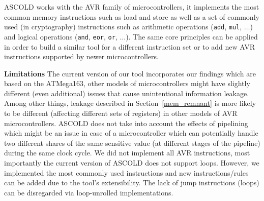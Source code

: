 ASCOLD works with the AVR family of microcontrollers, 
it implements the most common memory instructions such as load and store 
as well as a set of commonly used (in cryptography) instructions such as arithmetic operations
(\texttt{add}, \texttt{mul}, $\dots$) and logical operations (\texttt{and}, \texttt{eor}, \texttt{or}, $\dots$). The same core principles can be applied
in order to build a similar tool for a different instruction set or to add 
new AVR instructions supported by newer microcontrollers.

\textbf{Limitations} The current version of our tool
incorporates our findings which are based on the ATMega163, other models of microcontrollers
might have slightly different (even additional) issues that cause unintentional information leakage.
Among other things, leakage described in Section~\ref{mem_remnant} is more likely to be different (affecting different sets of registers) in other models of AVR microcontrollers.
ASCOLD does not take into account the effects of pipelining which might be an issue
in case of a microcontroller which can potentially handle two different shares of the same sensitive
value (at different stages of the pipeline) during the same clock cycle.
We did not implement all AVR instructions, most importantly
the current version of ASCOLD does not support loops.
However, we implemented the most commonly used instructions and new instructions/rules
can be added due to the tool's extensibility. The lack of jump instructions (loops)
can be disregarded via loop-unrolled implementations.